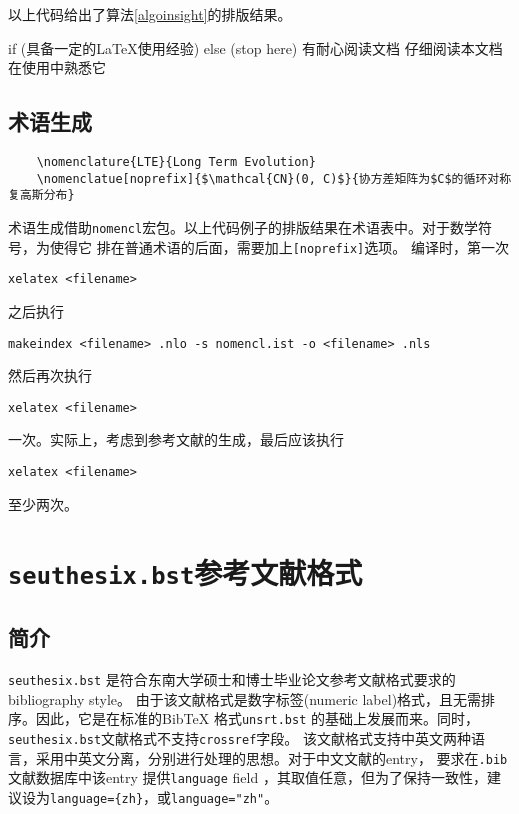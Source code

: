 \documentclass[figurelist,tablelist,algorithmlist,nomlist,masters]{seuthesix}
\begin{document}
以上代码给出了算法\ref{algoinsight}的排版结果。
\begin{algorithm}
	\caption{\label{algoinsight}如何使用\seuthesix 文档类}
	\begin{algorithmic}[1]
		\STATE if (具备一定的\LaTeX 使用经验) else (stop here)
		\STATE 有耐心阅读文档
		\STATE 仔细阅读本文档
		\STATE 在使用中熟悉它
	\end{algorithmic}
\end{algorithm}

\section{术语生成}
{\color{magenta}
	\begin{verbatim}
	\nomenclature{LTE}{Long Term Evolution}
	\nomenclatue[noprefix]{$\mathcal{CN}(0, C)$}{协方差矩阵为$C$的循环对称复高斯分布}
	\end{verbatim}
}
术语生成借助\texttt{nomencl}宏包。以上代码例子的排版结果在术语表中。对于数学符号，为使得它
排在普通术语的后面，需要加上\texttt{[noprefix]}选项。
编译时，第一次

\verb+xelatex <filename>+ 

之后执行 

\verb+makeindex <filename> .nlo -s nomencl.ist -o <filename> .nls+

然后再次执行

\verb+xelatex <filename>+

一次。实际上，考虑到参考文献的生成，最后应该执行

\verb+xelatex <filename>+

至少两次。
\chapter{\texttt{seuthesix.bst}参考文献格式\label{bst}}
\section{简介}
\texttt{seuthesix.bst} 是符合东南大学硕士和博士毕业论文参考文献格式要求的 bibliography style。
由于该文献格式是数字标签(numeric label)格式，且无需排序。因此，它是在标准的BibTeX
格式\texttt{unsrt.bst} 的基础上发展而来。同时，\verb=seuthesix.bst=文献格式不支持\texttt{crossref}字段。
该文献格式支持中英文两种语言，采用中英文分离，分别进行处理的思想。对于中文文献的entry，
要求在\verb=.bib=文献数据库中该entry 提供\texttt{language} field
，其取值任意，但为了保持一致性，建议设为\verb+language={zh}+，或\verb+language="zh"+。
\end{document}
